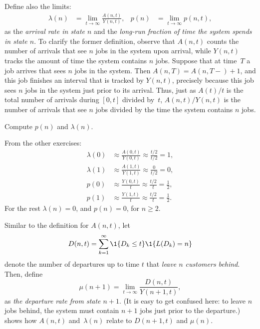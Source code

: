 Define also the limits:
\begin{align}\label{eq:p(n)}
  \lambda(n) &= \lim_{t\to\infty} \frac{A(n,t)}{Y(n,t)}, &p(n) &=\lim_{t\to\infty} p(n,t),
\end{align}
as the \emph{arrival rate in state $n$} and the \emph{long-run fraction of
  time the system spends in state $n$}. To clarify the former
definition, observe that $A(n,t)$ counts the number of arrivals that
see $n$ jobs in the system upon arrival, while $Y(n,t)$ tracks the amount of time
the system contains $n$ jobs. Suppose that at time~$T$ a job arrives that
sees $n$ jobs in the system. Then $A(n,T)=A(n, T-)+1$, and this job finishes
an interval that is tracked by $Y(n,t)$, precisely because this job
sees $n$ jobs in the system just prior to its arrival. Thus, just as
$A(t)/t$ is the total number of arrivals during $[0,t]$ divided by~$t$, $A(n,t)/Y(n,t)$ is the number of arrivals that see $n$ jobs divided by
the time the system contains $n$ jobs.

\begin{exercise}  
Compute $p(n)$ and $\lambda(n)$.
\begin{solution}
    From the other exercises:
    \begin{align*}
      \lambda(0) &\approx \frac{A(0,t)}{Y(0,t)} \approx \frac{t/2}{t/2} = 1, \\
      \lambda(1) &\approx \frac{A(1,t)}{Y(1,t)} \approx \frac{0}{t/2} = 0, \\
      p(0) &\approx \frac{Y(0,t)}{t} \approx \frac{t/2}{t} = \frac 1 2, \\
      p(1) &\approx \frac{Y(1,t)}{t} \approx \frac{t/2}{t} = \frac 1 2.
    \end{align*}
For the rest $\lambda(n) = 0$, and $p(n)=0$, for $n\geq 2$.
\end{solution}
\end{exercise}

Similar to the definition for $A(n,t)$, let
\begin{equation*}
    D(n,t) = \sum_{k=1}^\infty \1{D_k \leq t} \1{L(D_k) = n}
  \end{equation*}
  denote the number of departures up to time $t$ that\emph{ leave $n$
    customers behind}. Then,  define
\begin{equation*}
  \mu(n+1) = \lim_{t\to\infty} \frac{D(n,t)}{Y(n+1,t)},
\end{equation*}
as \emph{ the departure rate from state $n+1$}.
(It is easy to get confused here: to leave $n$ jobs behind, the system must contain $n+1$ jobs just prior to the departure.)
 shows how $A(n,t)$ and~$\lambda(n)$ relate to $D(n+1,t)$ and $\mu(n)$.

